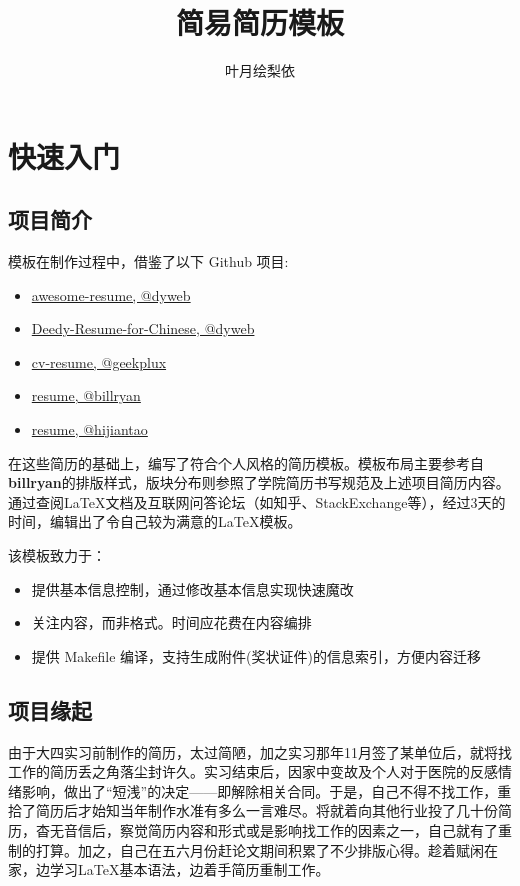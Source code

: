 \documentclass[a4paper,12pt]{ctexart}
\title{简易简历模板}
\author{叶月绘梨依}
\newenvironment{ul}{
	\begin{itemize}[topsep=0pt,labelsep=.5em,leftmargin=4.5em,itemsep=-.5em]
	}{\end{itemize}}
\begin{document}
	\maketitle
	\setcounter{page}{0}
	\thispagestyle{empty}
	
	\newpage
	\tableofcontents
	
	\newpage
	\setcounter{page}{1}
	\section{快速入门}
	\subsection{项目简介}
	模板在制作过程中，借鉴了以下 Github 项目:
	\begin{ul}
		\item\href{https://github.com/dyweb/awesome-resume-for-chinese}{awesome-resume, @dyweb}
		\item\href{https://github.com/dyweb/Deedy-Resume-for-Chinese}{Deedy-Resume-for-Chinese, @dyweb}
		\item\href{https://github.com/geekplux/cv_resume}{cv-resume, @geekplux}
		\item\href{https://github.com/billryan/resume}{resume, @billryan}
		\item\href{https://github.com/hijiangtao/resume}{resume, @hijiantao}
	\end{ul}
	
	在这些简历的基础上，编写了符合个人风格的简历模板。模板布局主要参考自 \textbf{billryan}的排版样式，版块分布则参照了学院简历书写规范及上述项目简历内容。通过查阅\LaTeX{}文档及互联网问答论坛（如知乎、StackExchange等），经过3天的时间，编辑出了令自己较为满意的\LaTeX 模板。
	

	该模板致力于：
	\begin{ul}
		\item 提供基本信息控制，通过修改基本信息实现快速魔改
		\item 关注内容，而非格式。时间应花费在内容编排
		\item 提供 Makefile 编译，支持生成附件(奖状证件)的信息索引，方便内容迁移
	\end{ul}
	
	\subsection{项目缘起}
	由于大四实习前制作的简历，太过简陋，加之实习那年11月签了某单位后，就将找工作的简历丢之角落尘封许久。实习结束后，因家中变故及个人对于医院的反感情绪影响，做出了“短浅”的决定——即解除相关合同。于是，自己不得不找工作，重拾了简历后才始知当年制作水准有多么一言难尽。将就着向其他行业投了几十份简历，杳无音信后，察觉简历内容和形式或是影响找工作的因素之一，自己就有了重制的打算。加之，自己在五六月份赶论文期间积累了不少排版心得。趁着赋闲在家，边学习\LaTeX 基本语法，边着手简历重制工作。
	
\end{document}
